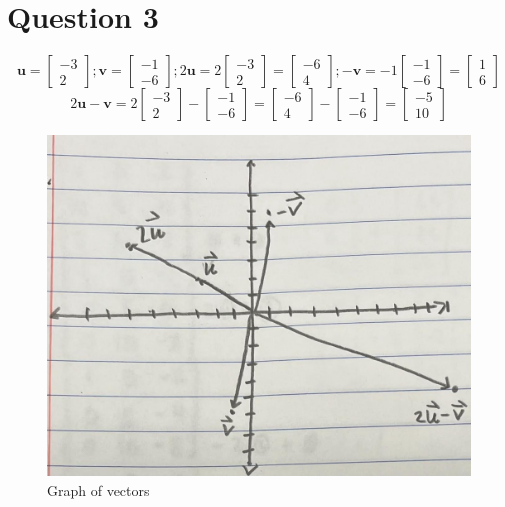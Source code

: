 \documentclass{report}
\begin{document}
\clearpage
\section*{Question 3}
\begin{equation*}
\textbf{u}
=
\begin{bmatrix}
-3 \\
2
\end{bmatrix}
;
\textbf{v}
=
\begin{bmatrix}
-1 \\
-6
\end{bmatrix}
;
2
\textbf{u}
=
2
\begin{bmatrix}
-3 \\
2
\end{bmatrix}
=
\begin{bmatrix}
-6 \\
4
\end{bmatrix}
;
-
\textbf{v}
=
-1
\begin{bmatrix}
-1 \\
-6
\end{bmatrix}
=
\begin{bmatrix}
1 \\
6
\end{bmatrix}
\end{equation*}
\begin{equation*}
2
\textbf{u}
-
\textbf{v}
=
2
\begin{bmatrix}
-3 \\
2
\end{bmatrix}
-
\begin{bmatrix}
-1 \\
-6
\end{bmatrix}
=
\begin{bmatrix}
-6 \\
4
\end{bmatrix}
-
\begin{bmatrix}
-1 \\
-6
\end{bmatrix}
=
\begin{bmatrix}
-5 \\
10
\end{bmatrix}
\end{equation*}
\begin{figure}[h]
  \includegraphics[width=\linewidth]{graph.jpg}
  \caption{Graph of vectors}
  \label{fig:graph1}
\end{figure}
\end{document}
